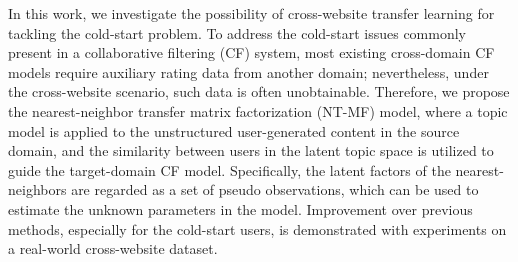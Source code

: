 In this work, we investigate the possibility of cross-website transfer learning for tackling the cold-start problem. To address the cold-start issues commonly present in a collaborative filtering (CF) system, most existing cross-domain CF models require auxiliary rating data from another domain; nevertheless, under the cross-website scenario, such data is often unobtainable. Therefore, we propose the nearest-neighbor transfer matrix factorization (NT-MF) model, where a topic model is applied to the unstructured user-generated content in the source domain, and the similarity between users in the latent topic space is utilized to guide the target-domain CF model. Specifically, the latent factors of the nearest-neighbors are regarded as a set of pseudo observations, which can be used to estimate the unknown parameters in the model. Improvement over previous methods, especially for the cold-start users, is demonstrated with experiments on a real-world cross-website dataset.
